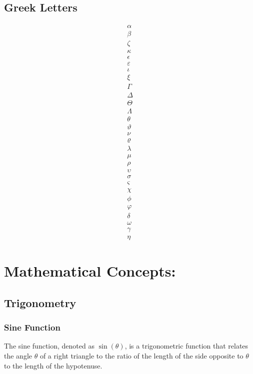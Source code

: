 \documentclass{article}
\begin{document}
\subsection{Greek Letters}
\begin{align*}
    \alpha \\
    \beta \\
    \zeta \\
    \kappa \\
    \epsilon \\
    \varepsilon \\
    \iota \\
    \xi \\
    \Gamma \\
    \Delta \\
    \Theta \\
    \Lambda \\
    \theta \\
    \vartheta \\
    \nu \\
    \varrho \\
    \lambda \\
    \mu \\
    \rho \\
    \upsilon \\
    \sigma \\
    \varsigma \\
    \chi \\
    \phi \\
    \varphi \\
    \delta \\
    \omega \\
    \gamma \\
    \eta 
\end{align*}

\section{Mathematical Concepts:}

\subsection{Trigonometry}

\subsubsection{Sine Function}
The sine function, denoted as \(\sin(\theta)\), is a trigonometric function that relates the angle \(\theta\) of a right triangle to the ratio of the length of the side opposite to \(\theta\) to the length of the hypotenuse.
\end{document}

